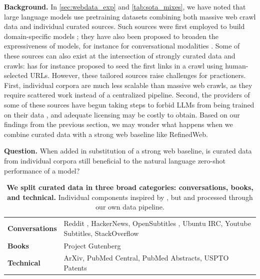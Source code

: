 \documentclass{article}
\begin{document}
\textbf{Background.} In \cref{sec:webdata_exp} and \cref{tab:sota_mixes}, we have noted that large language models use pretraining datasets combining both massive web crawl data and individual curated sources. Such sources were first employed to build domain-specific models \citep{beltagy2019scibert}; they have also been proposed to broaden the expressiveness of models, for instance for conversational modalities \citep{adiwardana2020towards, thoppilan2022lamda}. Some of these sources can also exist at the intersection of strongly curated data and crawls: \citet{roots} has for instance proposed to seed the first links in a crawl using human-selected URLs. However, these tailored sources raise challenges for practioners. First, individual corpora are much less scalable than massive web crawls, as they require scattered work instead of a centralized pipeline. Second, the providers of some of these sources have begun taking steps to forbid LLMs from being trained on their data \cite{Paresh_2023}, and adequate licensing may be costly to obtain. Based on our findings from the previous section, we may wonder what happens when we combine curated data with a strong web baseline like RefinedWeb.

\begin{mdframed}[style=side]
\textbf{Question.} When added in substitution of a strong web baseline, is curated data from individual corpora still beneficial to the natural language zero-shot performance of a model?
\end{mdframed}

\begin{table}[t]
\begin{center}
\caption{\textbf{We split curated data in three broad categories: conversations, books, and technical.} Individual components inspired by \citet{gao2020pile}, but and processed through our own data pipeline.}
\label{tab:data_categories}
\vspace{0.2in}
\begin{tabular}{lp{10cm}}
\toprule
\textbf{Conversations} & Reddit \citep{baumgartner2020pushshift}, HackerNews, OpenSubtitles \citep{tiedemann-2016-finding}, Ubuntu IRC, Youtube Subtitles, StackOverflow \\
\textbf{Books} & Project Gutenberg \cite{rae2019compressive} \\
\textbf{Technical} & ArXiv, PubMed Central, PubMed Abstracts, USPTO Patents \\
\bottomrule
\end{tabular}
\end{center}
\end{table}
\end{document}

